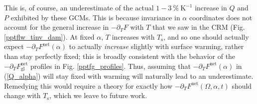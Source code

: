 \documentclass[10pt]{article}
\newcommand{\beqn}{\begin{equation}}
\newcommand{\eeqn}{\end{equation}}
\newcommand{\eqnref}[1]{(\ref{#1})}
\newcommand{\n}{\nonumber}
\newcommand{\ppt}{\ensuremath{\partial_T}}
\newcommand{\Fnet}{\ensuremath{F^\mathrm{net}}}
\newcommand{\Fnetgl}{\ensuremath{F^\mathrm{net}_{\mathrm{gl}}}}
\newcommand{\Ts}{\ensuremath{T_\mathrm{s}}}
\newcommand{\Tsgl}{\ensuremath{T_\mathrm{s,gl}}}
\newcommand{\Ttp}{\ensuremath{T_\mathrm{tp}}}
\newcommand{\Kinverse}{\ensuremath{\mathrm{K^{-1}}}}
\begin{document}
This is, of course, an underestimate of the actual $1-3 \ \% \ \Kinverse$ increase in $Q$ and $P$ exhibited by these GCMs. This is because invariance in $\alpha$ coordinates does not account for  the general increase in $-\ppt F$ with $T$ that we saw in the CRM (Fig. \ref{pptflw_tinv_dam}). At fixed $\alpha$, $T$ increases with \Ts, and so one should actually expect $-\ppt\Fnet(\alpha)$ to actually \emph{increase} slightly with surface warming, rather than stay perfectly fixed; this is broadly consistent with the behavior of the $-\ppt \Fnetgl$ profiles in Fig. \ref{pptfg_profiles}.  Thus, assuming that $-\ppt \Fnet(\alpha)$ in \eqnref{Q_alpha} will stay fixed with warming will naturally lead to an underestimate. Remedying this would require a  theory for exactly how $-\ppt \Fnet(\Omega,\alpha,t)$ should change with \Ts, which we leave to future work.	


%
\end{document}
